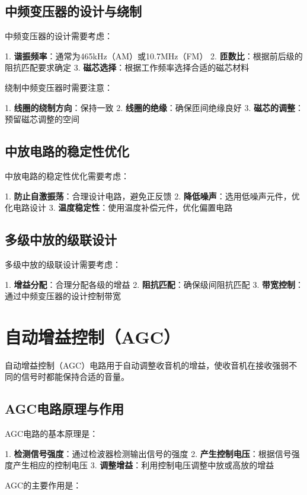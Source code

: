 \documentclass[12pt,UTF8]{ctexbook}
\begin{document}
\section{中频变压器的设计与绕制}

中频变压器的设计需要考虑：

1. \textbf{谐振频率}：通常为465kHz（AM）或10.7MHz（FM）
2. \textbf{匝数比}：根据前后级的阻抗匹配要求确定
3. \textbf{磁芯选择}：根据工作频率选择合适的磁芯材料

绕制中频变压器时需要注意：

1. \textbf{线圈的绕制方向}：保持一致
2. \textbf{线圈的绝缘}：确保匝间绝缘良好
3. \textbf{磁芯的调整}：预留磁芯调整的空间

\section{中放电路的稳定性优化}

中放电路的稳定性优化需要考虑：

1. \textbf{防止自激振荡}：合理设计电路，避免正反馈
2. \textbf{降低噪声}：选用低噪声元件，优化电路设计
3. \textbf{温度稳定性}：使用温度补偿元件，优化偏置电路

\section{多级中放的级联设计}

多级中放的级联设计需要考虑：

1. \textbf{增益分配}：合理分配各级的增益
2. \textbf{阻抗匹配}：确保级间阻抗匹配
3. \textbf{带宽控制}：通过中频变压器的设计控制带宽

\chapter{自动增益控制（AGC）}

自动增益控制（AGC）电路用于自动调整收音机的增益，使收音机在接收强弱不同的信号时都能保持合适的音量。

\section{AGC电路原理与作用}

AGC电路的基本原理是：

1. \textbf{检测信号强度}：通过检波器检测输出信号的强度
2. \textbf{产生控制电压}：根据信号强度产生相应的控制电压
3. \textbf{调整增益}：利用控制电压调整中放或高放的增益

AGC的主要作用是：
\end{document}
